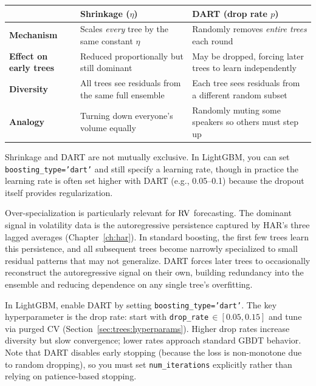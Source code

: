 \begin{center}
\renewcommand{\arraystretch}{1.25}
\begin{tabular}{@{}lp{5.8cm}p{5.8cm}@{}}
\toprule
& \textbf{Shrinkage} ($\eta$) & \textbf{DART} (drop rate $p$) \\
\midrule
\textbf{Mechanism}
  & Scales \emph{every} tree by the same constant $\eta$
  & Randomly removes \emph{entire trees} each round \\
\textbf{Effect on early trees}
  & Reduced proportionally but still dominant
  & May be dropped, forcing later trees to learn independently \\
\textbf{Diversity}
  & All trees see residuals from the same full ensemble
  & Each tree sees residuals from a different random subset \\
\textbf{Analogy}
  & Turning down everyone's volume equally
  & Randomly muting some speakers so others must step up \\
\bottomrule
\end{tabular}
\end{center}

Shrinkage and DART are not mutually exclusive.  In LightGBM, you can set
\texttt{boosting\_type='dart'} and still specify a learning rate, though in
practice the learning rate is often set higher with DART (e.g., 0.05--0.1)
because the dropout itself provides regularization.

\begin{projectconnection}
Over-specialization is particularly relevant for $\operatorname{RV}$ forecasting.  The
dominant signal in volatility data is the autoregressive persistence captured
by HAR's three lagged averages (Chapter~\ref{ch:har}).  In standard
boosting, the first few trees learn this persistence, and all subsequent
trees become narrowly specialized to small residual patterns that may not
generalize.  DART forces later trees to occasionally reconstruct the
autoregressive signal on their own, building redundancy into the ensemble
and reducing dependence on any single tree's overfitting.

In LightGBM, enable DART by setting \texttt{boosting\_type='dart'}.  The key
hyperparameter is the drop rate: start with
\texttt{drop\_rate}$\,\in [0.05, 0.15]$ and tune via purged CV
(Section~\ref{sec:trees:hyperparams}).  Higher drop rates increase diversity
but slow convergence; lower rates approach standard GBDT behavior.  Note that
DART disables early stopping (because the loss is non-monotone due to random
dropping), so you must set \texttt{num\_iterations} explicitly rather than
relying on patience-based stopping.
\end{projectconnection}

